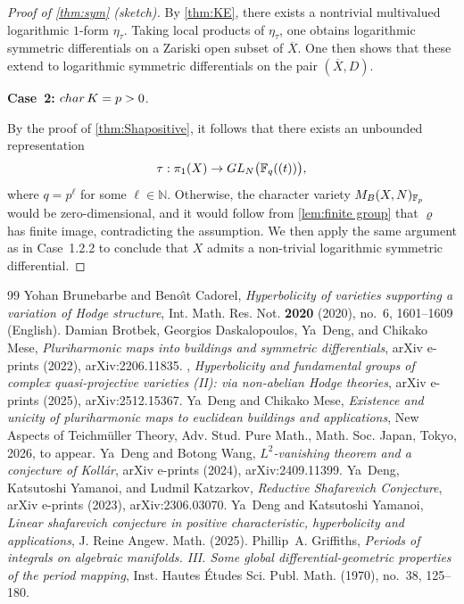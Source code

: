\documentclass[10pt,a4paper]{amsart}
\newcommand{\GL}{{\rm GL}}
\newcommand{\bF}{\mathbb{F}}
\newcommand{\bN}{\mathbb{N}}
\begin{document}
\begin{proof}[Proof  of \cref{thm:sym} (sketch)]
By \cref{thm:KE}, there exists a nontrivial multivalued logarithmic \(1\)-form \(\eta_{\tau}\).
Taking local products of \(\eta_{\tau}\), one obtains logarithmic symmetric differentials on a 
Zariski open subset of \(\overline{X}\).
One then shows that these extend to logarithmic symmetric differentials on the pair 
\((\overline{X}, D)\).
	
	\medskip
	
	\noindent\textbf{Case~2:} ${\rm char}\, K = p>0$.
	
	By the proof of \cref{thm:Shapositive}, it follows that there exists an unbounded
	representation
	\[
	\tau:\pi_1(X)\to \GL_N\bigl(\bF_q((t))\bigr),
	\]
	where $q=p^\ell$ for some $\ell\in \bN$. Otherwise, the character variety
	$M_{\rm B}(X,N)_{\bF_p}$ would be zero-dimensional, and it would follow from
	\cref{lem:finite group} that $\varrho$ has finite image, contradicting the assumption.
	We then apply the same argument as in  {Case~1.2.2} to conclude that $X$
	admits a non-trivial logarithmic symmetric differential.
\end{proof}

\begin{thebibliography}{99}
 Yohan Brunebarbe and Beno{\^{\i}}t Cadorel, \emph{Hyperbolicity of varieties supporting a variation of {Hodge} structure}, Int. Math. Res. Not. \textbf{2020} (2020), no.~6, 1601--1609 (English).
 Damian {Brotbek}, Georgios {Daskalopoulos}, Ya~{Deng}, and Chikako {Mese}, \emph{{Pluriharmonic maps into buildings and symmetric differentials}}, arXiv e-prints (2022), arXiv:2206.11835.
 \bysame, \emph{{Hyperbolicity and fundamental groups of complex quasi-projective varieties (II): via non-abelian Hodge theories}}, arXiv e-prints (2025), arXiv:2512.15367.
 Ya~{Deng} and Chikako {Mese}, \emph{Existence and unicity of pluriharmonic maps to euclidean buildings and applications}, New Aspects of Teichmüller Theory, Adv. Stud. Pure Math., Math. Soc. Japan, Tokyo, 2026, to appear.
 Ya~{Deng} and Botong {Wang}, \emph{{$L^2$-vanishing theorem and a conjecture of Koll{\'a}r}}, arXiv e-prints (2024), arXiv:2409.11399.
 Ya~{Deng}, Katsutoshi {Yamanoi}, and Ludmil {Katzarkov}, \emph{{Reductive Shafarevich Conjecture}}, arXiv e-prints (2023), arXiv:2306.03070.
 Ya~{Deng} and Katsutoshi {Yamanoi}, \emph{Linear shafarevich conjecture in positive characteristic, hyperbolicity and applications}, J. Reine Angew. Math. (2025).
 Phillip~A. Griffiths, \emph{Periods of integrals on algebraic manifolds. {III}. {S}ome global differential-geometric properties of the period mapping}, Inst. Hautes \'{E}tudes Sci. Publ. Math. (1970), no.~38, 125--180. 
\end{thebibliography}
\end{document}
